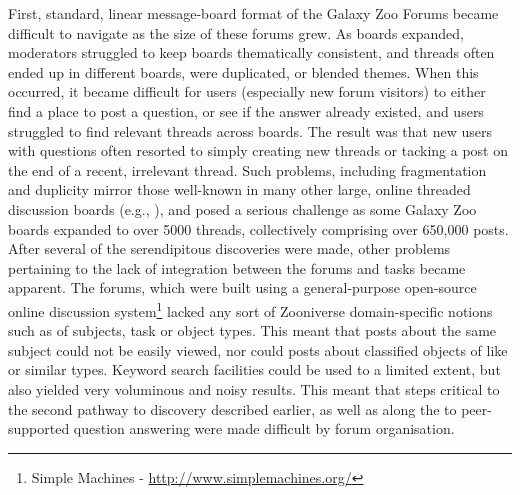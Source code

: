 \documentclass{sigchi}
\begin{document}
First, standard, linear message-board format of the Galaxy Zoo Forums became difficult to navigate as the size of these forums grew.  As boards expanded, moderators struggled to keep boards thematically consistent, and threads often ended up in different boards, were duplicated, or blended themes.  When this occurred, it became difficult for users (especially new forum visitors) to either find a place to post a question, or see if the answer already existed, and users struggled to find relevant threads across boards.  The result was that new users with questions often resorted to simply creating new threads or tacking a post on the end of a recent, irrelevant thread.  Such problems, including fragmentation and duplicity mirror those well-known  in many other large, online threaded discussion boards (e.g., \cite{murphy2004graduate}), and posed a serious challenge as some Galaxy Zoo boards expanded to over 5000 threads, collectively comprising over 650,000 posts. 
After several of the serendipitous discoveries were made, other problems pertaining to the lack of integration between the forums and tasks became apparent.  The forums, which were built using a general-purpose open-source online discussion system\footnote{Simple Machines - \url{http://www.simplemachines.org/}} lacked any sort of Zooniverse domain-specific notions such as of subjects, task or object types. This meant that posts about the same subject could not be easily viewed, nor could posts about classified objects of like or similar types.  Keyword search facilities could be used to a limited extent, but also yielded very voluminous and noisy results. This meant that steps critical to the second pathway to discovery described earlier, as well as along the to peer-supported question answering were made difficult by forum organisation.

\end{document}
